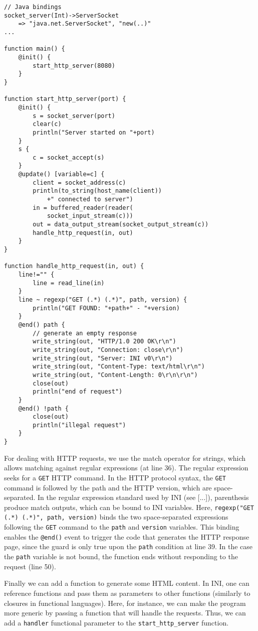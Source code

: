 \documentclass[11pt]{report}
\begin{document}
\begin{lstlisting}
// Java bindings
socket_server(Int)->ServerSocket
	=> "java.net.ServerSocket", "new(..)"
...
	
function main() {
	@init() {
		start_http_server(8080)
	}
}

function start_http_server(port) {
	@init() {
		s = socket_server(port)
		clear(c)
		println("Server started on "+port)
	}
	s {
		c = socket_accept(s)
	}
	@update() [variable=c] {
		client = socket_address(c)
		println(to_string(host_name(client))
			+" connected to server")
		in = buffered_reader(reader(
			socket_input_stream(c)))
		out = data_output_stream(socket_output_stream(c))
		handle_http_request(in, out)
	}		
}

function handle_http_request(in, out) {
	line!="" {
		line = read_line(in)
	}
	line ~ regexp("GET (.*) (.*)", path, version) {
		println("GET FOUND: "+path+" - "+version)
	}
	@end() path {
		// generate an empty response
		write_string(out, "HTTP/1.0 200 OK\r\n")
		write_string(out, "Connection: close\r\n")
		write_string(out, "Server: INI v0\r\n")
		write_string(out, "Content-Type: text/html\r\n")
		write_string(out, "Content-Length: 0\r\n\r\n")
		close(out)
		println("end of request")
	}
	@end() !path {
		close(out)
		println("illegal request")
	}
}
\end{lstlisting}

For dealing with HTTP requests, we use the match operator for strings, which allows matching against regular expressions (at line 36). The regular expression seeks for a \texttt{GET} HTTP command. In the HTTP protocol syntax, the \texttt{GET} command is followed by the path and the HTTP version, which are space-separated. In the regular expression \cite{friedl2006} standard used by INI (see [...]), parenthesis produce match outputs, which can be bound to INI variables. Here, \texttt{regexp("GET (.*) (.*)", path, version)} binds the two space-separated expressions following the \texttt{GET} command to the \texttt{path} and \texttt{version} variables. This binding enables the \texttt{@end()} event to trigger the code that generates the HTTP response page, since the guard is only true upon the \texttt{path} condition at line 39. In the case the \texttt{path} variable is not bound, the function ends without responding to the request (line 50).

Finally we can add a function to generate some HTML content. In INI, one can reference functions and pass them as parameters to other functions (similarly to closures in functional languages). Here, for instance, we can make the program more generic by passing a function that will handle the requests. Thus, we can add a \texttt{handler} functional parameter to the \texttt{start\_http\_server} function.
\end{document}
